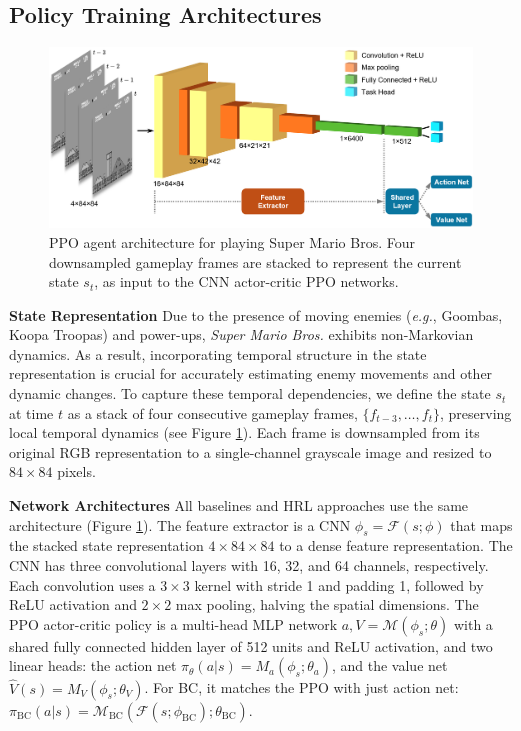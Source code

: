 \documentclass{article}
\begin{document}
\subsection{Policy Training Architectures}

\begin{figure}[htbp]
      \centering
      \includegraphics[width=\columnwidth]{figures/architecture.png}
      \caption{PPO agent architecture for playing Super Mario Bros.
      Four downsampled gameplay frames are stacked 
      to represent the current state $s_t$, as input to the CNN actor-critic PPO
      networks.}
      \label{fig:arch}
\end{figure}

\textbf{State Representation}
Due to the presence of moving enemies (\textit{e.g.}, Goombas, Koopa Troopas) 
and power-ups, \textit{Super Mario Bros.} exhibits non-Markovian dynamics.
As a result, incorporating temporal structure in the state representation is 
crucial for accurately estimating enemy movements and other dynamic changes. 
To capture these temporal dependencies, we define the state $s_t$ at time $t$ 
as a stack of four consecutive gameplay frames, $\{ f_{t-3}, \dots, f_t \}$, 
preserving local temporal dynamics (see Figure \ref{fig:arch}). 
Each frame is downsampled from its original RGB representation to a 
single-channel grayscale image and resized to $84 \times 84$ pixels.

\textbf{Network Architectures}
All baselines and HRL approaches use the same architecture 
(Figure \ref{fig:arch}). The feature extractor is a CNN 
$\phi_s = \mathcal{F}(s;\phi)$ that maps the stacked state 
representation \(4 \times 84 \times 84\) to a dense feature 
representation. The CNN has three convolutional layers with 16, 32, 
and 64 channels, respectively. Each convolution uses a \(3 \times 3\) 
kernel with stride 1 and padding 1, followed by ReLU activation and 
\(2 \times 2\) max pooling, halving the spatial dimensions. 
The PPO actor-critic policy 
is a multi-head MLP network $a, V = \mathcal{M}(\phi_s; \theta)$ with a 
shared fully connected hidden layer of 512 units and 
ReLU activation, and two linear heads:
the action net $ \pi_\theta(a|s) = M_a(\phi_s;\theta_a)$,
and the value net ${\hat V}(s) = M_V(\phi_s;\theta_V)$.
For BC, it matches the PPO with just action net:
$ \pi_{\text{BC}}(a|s) =
\mathcal{M}_{\text{BC}}(\mathcal{F}(s;\phi_{\text{BC}});\theta_{\text{BC}})$.
\end{document}
